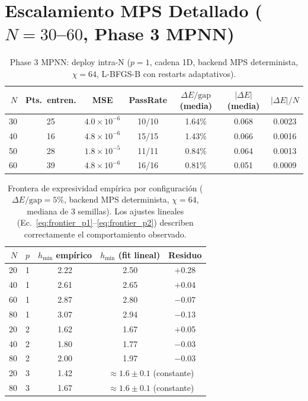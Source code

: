 \documentclass[11pt,a4paper,spanish]{book}
\begin{document}
\section{Escalamiento MPS Detallado ($N = 30$--$60$, Phase 3 MPNN)}

\begin{table}[h]
\centering
\caption{Phase 3 MPNN: deploy intra-N ($p = 1$, cadena 1D, backend MPS determinista, $\chi = 64$, L-BFGS-B con restarts adaptativos).}
\label{tab:app_phase3}
\begin{tabular}{rcccccc}
\toprule
\textbf{$N$} & \textbf{Pts.\ entren.} & \textbf{MSE} & \textbf{PassRate} & \textbf{$\Delta E/\text{gap}$ (media)} & \textbf{$|\Delta E|$ (media)} & \textbf{$|\Delta E|/N$} \\
\midrule
30 & 25 & $4.0 \times 10^{-6}$ & 10/10 & 1.64\% & 0.068 & 0.0023 \\
40 & 16 & $4.8 \times 10^{-6}$ & 15/15 & 1.43\% & 0.066 & 0.0016 \\
50 & 28 & $1.8 \times 10^{-5}$ & 11/11 & 0.84\% & 0.064 & 0.0013 \\
60 & 39 & $4.8 \times 10^{-6}$ & 16/16 & 0.81\% & 0.051 & 0.0009 \\
\bottomrule
\end{tabular}
\end{table}

\begin{table}[h]
\centering
\caption{Frontera de expresividad empírica por configuración ($\Delta E/\text{gap} = 5\%$, backend MPS determinista, $\chi = 64$, mediana de 3 semillas). Los ajustes lineales (Ec.~\ref{eq:frontier_p1}--\ref{eq:frontier_p2}) describen correctamente el comportamiento observado.}
\label{tab:app_frontier}
\begin{tabular}{rcccc}
\toprule
\textbf{$N$} & \textbf{$p$} & \textbf{$h_{\min}$ empírico} & \textbf{$h_{\min}$ (fit lineal)} & \textbf{Residuo} \\
\midrule
20 & 1 & 2.22 & 2.50 & $+$0.28 \\
40 & 1 & 2.61 & 2.65 & $+$0.04 \\
60 & 1 & 2.87 & 2.80 & $-$0.07 \\
80 & 1 & 3.07 & 2.94 & $-$0.13 \\
20 & 2 & 1.62 & 1.67 & $+$0.05 \\
40 & 2 & 1.80 & 1.77 & $-$0.03 \\
80 & 2 & 2.00 & 1.97 & $-$0.03 \\
20 & 3 & 1.42 & \multicolumn{2}{c}{$\approx 1.6 \pm 0.1$ (constante)} \\
80 & 3 & 1.67 & \multicolumn{2}{c}{$\approx 1.6 \pm 0.1$ (constante)} \\
\bottomrule
\end{tabular}
\end{table}
\end{document}
